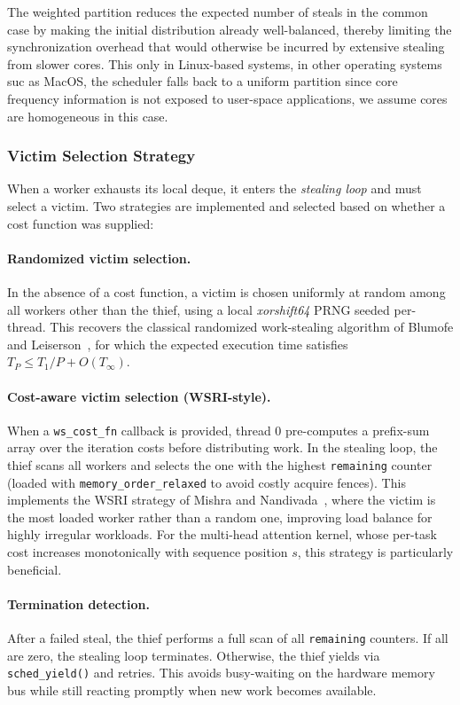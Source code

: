 \documentclass[11pt,english]{article}
\begin{document}
The weighted partition reduces the expected number of steals in the common case by making the initial distribution already well-balanced, thereby limiting the synchronization overhead that would otherwise be incurred by extensive stealing from slower cores. This only in Linux-based systems, in other operating systems suc as MacOS, the scheduler falls back to a uniform partition since core frequency information is not exposed to user-space applications, we assume cores are homogeneous in this case.
 
\subsubsection{Victim Selection Strategy}
 
When a worker exhausts its local deque, it enters the \emph{stealing loop} and must select a victim. Two strategies are implemented and selected based on whether a cost function was supplied:
 
\paragraph{Randomized victim selection.} In the absence of a cost function, a victim is chosen uniformly at random among all workers other than the thief, using a local \emph{xorshift64} PRNG seeded per-thread. This recovers the classical randomized work-stealing algorithm of Blumofe and Leiserson~\cite{blumofe1999workstealing}, for which the expected execution time satisfies $T_P \leq T_1/P + O(T_\infty)$.
 
\paragraph{Cost-aware victim selection (WSRI-style).} When a \texttt{ws\_cost\_fn} callback is provided, thread 0 pre-computes a prefix-sum array over the iteration costs before distributing work. In the stealing loop, the thief scans all workers and selects the one with the highest \texttt{remaining} counter (loaded with \texttt{memory\_order\_relaxed} to avoid costly acquire fences). This implements the WSRI strategy of Mishra and Nandivada~\cite{mishra2024cows}, where the victim is the most loaded worker rather than a random one, improving load balance for highly irregular workloads. For the multi-head attention kernel, whose per-task cost increases monotonically with sequence position $s$, this strategy is particularly beneficial.
 
\paragraph{Termination detection.} After a failed steal, the thief performs a full scan of all \texttt{remaining} counters. If all are zero, the stealing loop terminates. Otherwise, the thief yields via \texttt{sched\_yield()} and retries. This avoids busy-waiting on the hardware memory bus while still reacting promptly when new work becomes available.
 
\end{document}

